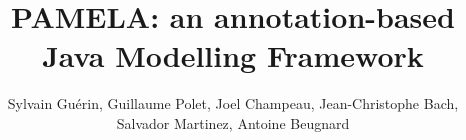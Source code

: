 \documentclass[sigchi]{acmart}
\begin{document}
\title{PAMELA: an annotation-based Java Modelling Framework}

\author{Sylvain Guérin, Guillaume Polet, Joel Champeau, Jean-Christophe Bach, Salvador Martinez, Antoine Beugnard}



\renewcommand{\shortauthors}{S. Guérin, et al.}







\maketitle
















\end{document}
